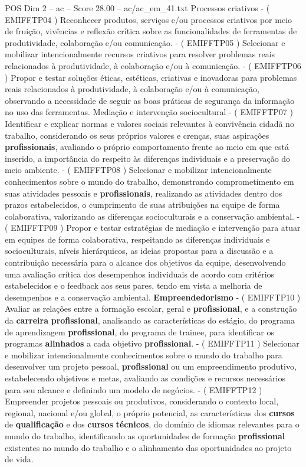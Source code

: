 \begin{textsample}{POS Dim 2 – ac – Score 28.00 – ac/ac\_em\_41.txt}
Processos criativos - ( EMIFFTP04 ) Reconhecer produtos, serviços e/ou processos criativos por meio de fruição, vivências e reflexão crítica sobre as funcionalidades de ferramentas de produtividade, colaboração e/ou comunicação. - ( EMIFFTP05 ) Selecionar e mobilizar intencionalmente recursos criativos para resolver problemas reais relacionados à produtividade, à colaboração e/ou à comunicação. - ( EMIFFTP06 ) Propor e testar soluções éticas, estéticas, criativas e inovadoras para problemas reais relacionados à produtividade, à colaboração e/ou à comunicação, observando a necessidade de seguir as boas práticas de segurança da informação no uso das ferramentas.
Mediação e intervenção sociocultural - ( EMIFFTP07 ) Identificar e explicar normas e valores sociais relevantes à convivência cidadã no trabalho, considerando os seus próprios valores e crenças, suas aspirações \textbf{profissionais}, avaliando o próprio comportamento frente ao meio em que está inserido, a importância do respeito às diferenças individuais e a preservação do meio ambiente. - ( EMIFFTP08 ) Selecionar e mobilizar intencionalmente conhecimentos sobre o mundo do trabalho, demonstrando comprometimento em suas atividades pessoais e \textbf{profissionais}, realizando as atividades dentro dos prazos estabelecidos, o cumprimento de suas atribuições na equipe de forma colaborativa, valorizando as diferenças socioculturais e a conservação ambiental. - ( EMIFFTP09 ) Propor e testar estratégias de mediação e intervenção para atuar em equipes de forma colaborativa, respeitando as diferenças individuais e socioculturais, níveis hierárquicos, as ideias propostas para a discussão e a contribuição necessária para o alcance dos objetivos da equipe, desenvolvendo uma avaliação crítica dos desempenhos individuais de acordo com critérios estabelecidos e o feedback aos seus pares, tendo em vista a melhoria de desempenhos e a conservação ambiental. \textbf{Empreendedorismo} - ( EMIFFTP10 ) Avaliar as relações entre a formação escolar, geral e \textbf{profissional}, e a construção da \textbf{carreira} \textbf{profissional}, analisando as características do estágio, do programa de aprendizagem \textbf{profissional}, do programa de trainee, para identificar os programas \textbf{alinhados} a cada objetivo \textbf{profissional}. - ( EMIFFTP11 ) Selecionar e mobilizar intencionalmente conhecimentos sobre o mundo do trabalho para desenvolver um projeto pessoal, \textbf{profissional} ou um empreendimento produtivo, estabelecendo objetivos e metas, avaliando as condições e recursos necessários para seu alcance e definindo um modelo de negócios. - ( EMIFFTP12 ) Empreender projetos pessoais ou produtivos, considerando o contexto local, regional, nacional e/ou global, o próprio potencial, as características dos \textbf{cursos} de \textbf{qualificação} e dos \textbf{cursos} \textbf{técnicos}, do domínio de idiomas relevantes para o mundo do trabalho, identificando as oportunidades de formação \textbf{profissional} existentes no mundo do trabalho e o alinhamento das oportunidades ao projeto de vida.


\end{textsample}
